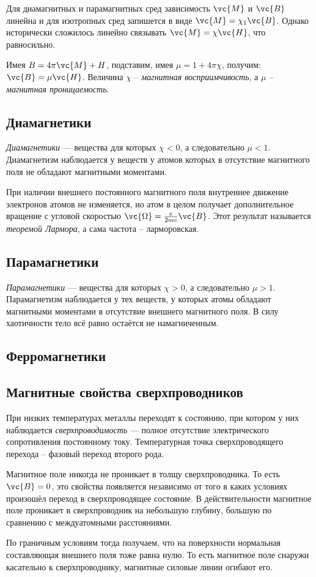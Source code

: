 Для диамагнитных и парамагнитных сред зависимость $\vc{M}$ и $\vc{B}$ линейна и для изотропных сред запишется в виде $\vc{M} = \chi_{1} \vc{B}$. Однако исторически сложилось линейно связывать $\vc{M} =\chi \vc{H}$, что равносильно.

Имея $B = 4 \pi \vc{M} + H$, подставим, имея $\mu= 1 + 4 \pi \chi$, получим:
$\vc{B} = \mu \vc{H}$.
Величина $\chi$ -- \textit{магнитная восприимчивость}, а $\mu$ -- \textit{магнитная проницаемость}.


\subsection{Диамагнетики}
\textit{Диамагнетики} --- вещества для которых $\chi < 0$, а следовательно $\mu<1$.
Диамагнетизм наблюдается у веществ у атомов которых в отсутствие магнитного поля не обладают магнитными моментами. 

При наличии внешнего постоянного магнитного поля внутреннее движение электронов атомов не изменяется, но атом в целом получает дополнительное вращение с угловой скоростью $\vc{\Omega} = \frac{e}{2 m c} \vc{B}$.
Этот результат называется \textit{теоремой Лармора}, а сама частота -- ларморовская.


\subsection{Парамагнетики}
\textit{Парамагнетики} --- вещества для которых $\chi > 0$, а следовательно $\mu>1$.
Парамагнетизм наблюдается у тех веществ, у которых атомы обладают магнитными моментами в отсутствие внешнего магнитного поля. В силу хаотичности тело всё равно остаётся не намагниченным.

\subsection{Ферромагнетики}





\subsection{Магнитные свойства сверхпроводников}
При низких температурах металлы переходят к состоянию, при котором у них наблюдается \textit{сверхпроводимость} --- полное отсутствие электрического сопротивления постоянному току. Температурная точка сверхпроводящего перехода -- фазовый переход второго рода.

Магнитное поле никогда не проникает в толщу сверхпроводника. То есть $\vc{B} = 0$, это свойства появляется независимо от того в каких условиях произошёл переход в сверхпроводящее состояние. В действительности магнитное поле проникает в сверхпроводник на небольшую глубину, большую по сравнению с междуатомными расстояниями.

По граничным условиям тогда получаем, что на поверхности нормальная составляющая внешнего поля тоже равна нулю. То есть магнитное поле снаружи касательно к сверхпроводнику, магнитные силовые линии огибают его.



